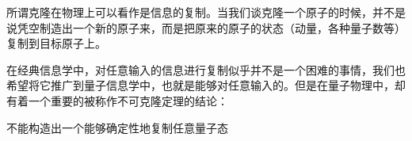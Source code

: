
所谓克隆在物理上可以看作是信息的复制。当我们谈克隆一个原子的时候，并不是说凭空制造出一个新的原子来，而是把原来的原子的状态（动量，各种量子数等）复制到目标原子上。

在经典信息学中，对任意输入的信息进行复制似乎并不是一个困难的事情，我们也希望将它推广到量子信息学中，也就是能够对任意输入的。但是在量子物理中，却有着一个重要的被称作不可克隆定理的结论：
\begin{theorem}{}
不能构造出一个能够确定性地复制任意量子态
\end{theorem}